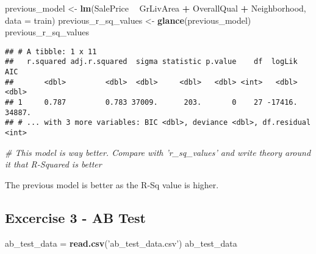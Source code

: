 \documentclass[]{article}
\newenvironment{Shaded}{\begin{snugshade}}{\end{snugshade}}
\newcommand{\KeywordTok}[1]{\textcolor[rgb]{0.13,0.29,0.53}{\textbf{#1}}}
\newcommand{\DataTypeTok}[1]{\textcolor[rgb]{0.13,0.29,0.53}{#1}}
\newcommand{\StringTok}[1]{\textcolor[rgb]{0.31,0.60,0.02}{#1}}
\newcommand{\CommentTok}[1]{\textcolor[rgb]{0.56,0.35,0.01}{\textit{#1}}}
\newcommand{\OperatorTok}[1]{\textcolor[rgb]{0.81,0.36,0.00}{\textbf{#1}}}
\newcommand{\NormalTok}[1]{#1}
\begin{document}
\begin{Shaded}
\begin{Highlighting}[]
\NormalTok{previous_model <-}\StringTok{ }\KeywordTok{lm}\NormalTok{(SalePrice }\OperatorTok{~}\StringTok{ }\NormalTok{GrLivArea }\OperatorTok{+}\StringTok{ }\NormalTok{OverallQual }\OperatorTok{+}\StringTok{ }\NormalTok{Neighborhood, }\DataTypeTok{data =}\NormalTok{ train)}
\NormalTok{previous_r_sq_values <-}\StringTok{ }\KeywordTok{glance}\NormalTok{(previous_model)}
\NormalTok{previous_r_sq_values}
\end{Highlighting}
\end{Shaded}

\begin{verbatim}
## # A tibble: 1 x 11
##   r.squared adj.r.squared  sigma statistic p.value    df  logLik    AIC
##       <dbl>         <dbl>  <dbl>     <dbl>   <dbl> <int>   <dbl>  <dbl>
## 1     0.787         0.783 37009.      203.       0    27 -17416. 34887.
## # ... with 3 more variables: BIC <dbl>, deviance <dbl>, df.residual <int>
\end{verbatim}

\begin{Shaded}
\begin{Highlighting}[]
\CommentTok{# This model is way better. Compare with 'r_sq_values' and write theory around it that R-Squared is better}
\end{Highlighting}
\end{Shaded}

The previous model is better as the R-Sq value is higher.

\subsection{Excercise 3 - AB Test}\label{excercise-3---ab-test}

\begin{Shaded}
\begin{Highlighting}[]
\NormalTok{ab_test_data =}\StringTok{ }\KeywordTok{read.csv}\NormalTok{(}\StringTok{'ab_test_data.csv'}\NormalTok{)}
\NormalTok{ab_test_data}
\end{Highlighting}
\end{Shaded}
\end{document}
